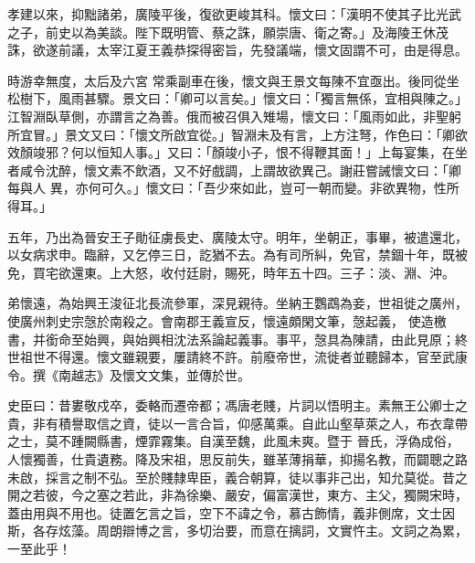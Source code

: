 \begin{pinyinscope}
 孝建以來，抑黜諸弟，廣陵平後，復欲更峻其科。懷文曰：「漢明不使其子比光武之子，前史以為美談。陛下既明管、蔡之誅，願崇唐、衛之寄。」及海陵王休茂誅，欲遂前議，太宰江夏王義恭探得密旨，先發議端，懷文固謂不可，由是得息。



 時游幸無度，太后及六宮
 常乘副車在後，懷文與王景文每陳不宜亟出。後同從坐松樹下，風雨甚驟。景文曰：「卿可以言矣。」懷文曰：「獨言無係，宜相與陳之。」江智淵臥草側，亦謂言之為善。俄而被召俱入雉場，懷文曰：「風雨如此，非聖躬所宜冒。」景文又曰：「懷文所啟宜從。」智淵未及有言，上方注弩，作色曰：「卿欲效顏竣邪？何以恒知人事。」又曰：「顏竣小子，恨不得鞭其面！」上每宴集，在坐者咸令沈醉，懷文素不飲酒，又不好戲調，上謂故欲異己。謝莊嘗誡懷文曰：「卿每與人
 異，亦何可久。」懷文曰：「吾少來如此，豈可一朝而變。非欲異物，性所得耳。」



 五年，乃出為晉安王子勛征虜長史、廣陵太守。明年，坐朝正，事畢，被遣還北，以女病求申。臨辭，又乞停三日，訖猶不去。為有司所糾，免官，禁錮十年，既被免，買宅欲還東。上大怒，收付廷尉，賜死，時年五十四。三子：淡、淵、沖。



 弟懷遠，為始興王浚征北長流參軍，深見親待。坐納王鸚鵡為妾，世祖徙之廣州，使廣州刺史宗愨於南殺之。會南郡王義宣反，懷遠頗閑文筆，愨起義，
 使造檄書，并銜命至始興，與始興相沈法系論起義事。事平，愨具為陳請，由此見原；終世祖世不得還。懷文雖親要，屢請終不許。前廢帝世，流徙者並聽歸本，官至武康令。撰《南越志》及懷文文集，並傳於世。



 史臣曰：昔婁敬戍卒，委輅而遷帝都；馮唐老賤，片詞以悟明主。素無王公卿士之貴，非有積譽取信之資，徒以一言合旨，仰感萬乘。自此山壑草萊之人，布衣韋帶之士，莫不踵闕縣書，煙霏霧集。自漢至魏，此風未爽。暨于
 晉氏，浮偽成俗，人懷獨善，仕貴遺務。降及宋祖，思反前失，雖革薄捐華，抑揚名教，而闢聰之路未啟，採言之制不弘。至於賤隸卑臣，義合朝算，徒以事非己出，知允莫從。昔之開之若彼，今之塞之若此，非為徐樂、嚴安，偏富漢世，東方、主父，獨闕宋時，蓋由用與不用也。徒置乞言之旨，空下不諱之令，慕古飾情，義非側席，文士因斯，各存炫藻。周朗辯博之言，多切治要，而意在摛詞，文實忤主。文詞之為累，一至此乎！



\end{pinyinscope}